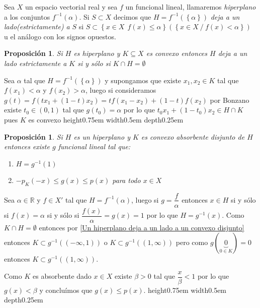 \documentclass[11pt]{article}
\newcommand{\R}{{\mathbb{R}}}
\newcommand{\sett}[1]{\left\lbrace#1\right\rbrace}
\numberwithin{theorem}{subsection}
\newtheorem{proposition}[theorem]{Proposici\'on}
\newenvironment{proof}[1][Demostraci\'on]{\begin{trivlist}
		\item[\hskip \labelsep {\bfseries #1}]}{\end{trivlist}}
\newenvironment{definition}[1][Definici\'on]{\begin{trivlist}
		\item[\hskip \labelsep {\bfseries #1}]}{\end{trivlist}}
\newcommand{\qed}{\nobreak \ifvmode \relax \else
	\ifdim\lastskip<1.5em \hskip-\lastskip
	\hskip1.5em plus0em minus0.5em \fi \nobreak
	\vrule height0.75em width0.5em depth0.25em\fi}
\begin{document}
\begin{definition}
	Sea $X$ un espacio vectorial real y sea $f$ un funcional lineal, llamaremos \textit{hiperplano} a los conjuntos $f^{-1}(\alpha)$. Si $S \subset X$ decimos que $H = f^{-1}(\sett{\alpha})$ \textit{deja a un lado(estrictamente) a } $S$ si $S \subset \sett{x \in X \  \ f(x) \leq \alpha} \left(\sett{x \in X \ / \ f(x) < \alpha}\right)$ u el an\'alogo con los signos opuestos.
\end{definition}

\begin{proposition}
	\label{Lemma1: Hanh-Banach geometrico}
	Si $H$ es hiperplano y $K \subseteq X$ es convexo entonces $H$ deja a un lado estrictamente a $K$ si y s\'olo si $K \cap H = \emptyset$
\end{proposition}

\begin{proof}
	\label{Un hiperplano deja a un lado a un convexo disjunto}
	Sea $\alpha$ tal que $H = f^{-1}(\sett{\alpha})$ y supongamos que existe $x_1,x_2 \in K$ tal que $f(x_1) < \alpha$ y $f(x_2) > \alpha $, luego si consideramos $g(t) = f(tx_1 + (1-t)x_2) = t f(x_1 - x_2) + (1-t)f(x_2)$ por Bonzano existe $t_0 \in (0,1)$ tal que $g(t_0) = \alpha$ por lo que $t_0 x_1 + (1-t_0)x_2 \in H \cap K$ pues $K$ es convexo \qed
\end{proof}

\begin{proposition}
	\label{Lemma2: Hanh-Banach geometrico}
	Si $H$ es un hiperplano y $K$ es convexo absorbente disjunto de $H$ entonces existe $g$ funcional lineal tal que:
	
	\begin{enumerate}
		\item $H = g^{-1}(1)$
		\item $-p_K(-x) \leq g(x) \leq p(x)$ para todo $x \in X$
	\end{enumerate}
\end{proposition}

\begin{proof}
	Sea $\alpha \in \R$ y $f \in X'$ tal que $H = f^{-1}(\alpha)$, luego si $g = \dfrac{f}{\alpha}$ entonces $x \in H$ si y s\'olo si $f(x) = \alpha$ si y s\'olo si $\dfrac{f(x)}{\alpha} = g(x) = 1$ por lo que $H = g^{-1}(x)$. Como $K \cap H = \emptyset$ entonces por \ref{Un hiperplano deja a un lado a un convexo disjunto} entonces $K \subset g^{-1}((-\infty, 1))$ o $K \subset g^{-1}((1,\infty))$ pero como $g(\underbrace{0}_{0 \in K}) = 0$ entonces $K \subset g^{-1}((1,\infty))$.
	
	Como $K$ es absorbente dado $x \in X$ existe $\beta > 0$ tal que $\dfrac{x}{\beta} < 1$ por lo que $g(x) < \beta$ y conclu\'imos que $g(x) \leq p(x)$. \qed	
	
\end{proof}
\end{document}
